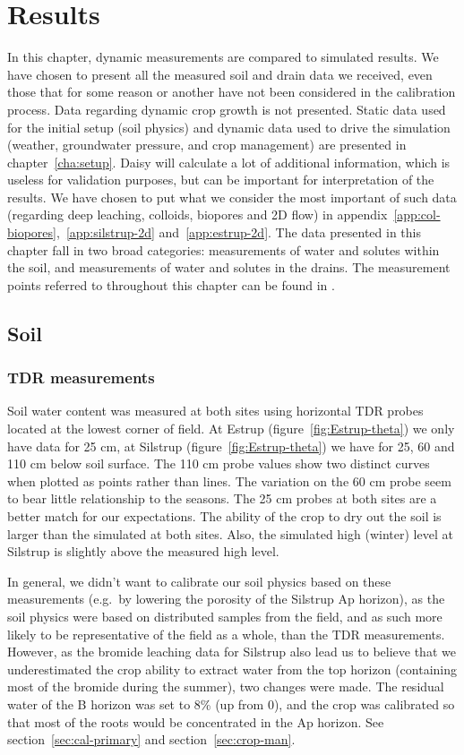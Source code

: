 \chapter{Results}

In this chapter, dynamic measurements are compared to simulated
results.  We have chosen to present all the measured soil and drain
data we received, even those that for some reason or another have not
been considered in the calibration process.  Data regarding dynamic
crop growth is not presented.  Static data used for the initial setup
(soil physics) and dynamic data used to drive the simulation (weather,
groundwater pressure, and crop management) are presented in
chapter~\ref{cha:setup}.  Daisy will calculate a lot of additional
information, which is useless for validation purposes, but can be
important for interpretation of the results.  We have chosen to put
what we consider the most important of such data (regarding deep
leaching, colloids, biopores and 2D flow) in
appendix~\ref{app:col-biopores},~\ref{app:silstrup-2d}
and~\ref{app:estrup-2d}.  The data presented in this chapter fall in
two broad categories: measurements of water and solutes within the
soil, and measurements of water and solutes in the drains.  The
measurement points referred to throughout this chapter can be found in
\citet{vap2009}.

\section{Soil}

\subsection{TDR measurements}

Soil water content was measured at both sites using horizontal TDR
probes located at the lowest corner of field.  At Estrup
(figure~\ref{fig:Estrup-theta}) we only have data for 25 cm, at
Silstrup (figure~\ref{fig:Estrup-theta}) we have for 25, 60 and 110 cm
below soil surface.  The 110 cm probe values show two distinct curves
when plotted as points rather than lines.  The variation on the 60 cm
probe seem to bear little relationship to the seasons.  The 25 cm
probes at both sites are a better match for our expectations.  The
ability of the crop to dry out the soil is larger than the simulated
at both sites.  Also, the simulated high (winter) level at Silstrup is
slightly above the measured high level.

In general, we didn't want to calibrate our soil physics based on
these measurements (e.g.\ by lowering the porosity of the Silstrup Ap
horizon), as the soil physics were based on distributed samples from
the field, and as such more likely to be representative of the field
as a whole, than the TDR measurements.  However, as the bromide
leaching data for Silstrup also lead us to believe that we
underestimated the crop ability to extract water from the top horizon
(containing most of the bromide during the summer), two changes were
made.  The residual water of the B horizon was set to 8\% (up from 0),
and the crop was calibrated so that most of the roots would be
concentrated in the Ap horizon.  See section~\ref{sec:cal-primary} and
section~\ref{sec:crop-man}.

